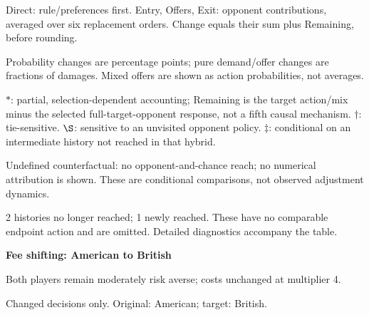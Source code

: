 \documentclass[10pt]{article}
\begin{document}
{\footnotesize Direct: rule/preferences first. Entry, Offers, Exit: opponent contributions, averaged over six replacement orders. Change equals their sum plus Remaining, before rounding.\par
Probability changes are percentage points; pure demand/offer changes are fractions of damages. Mixed offers are shown as action probabilities, not averages.\par
$*$: partial, selection-dependent accounting; Remaining is the target action/mix minus the selected full-target-opponent response, not a fifth causal mechanism. $\dagger$: tie-sensitive. $\S$: sensitive to an unvisited opponent policy. $\ddagger$: conditional on an intermediate history not reached in that hybrid.\par
Undefined counterfactual: no opponent-and-chance reach; no numerical attribution is shown. These are conditional comparisons, not observed adjustment dynamics.\par
2 histories no longer reached; 1 newly reached. These have no comparable endpoint action and are omitted. Detailed diagnostics accompany the table.}\par
\clearpage
{\large\bfseries Fee shifting: American to British}\par
Both players remain moderately risk averse; costs unchanged at multiplier 4.\par
{\small Changed decisions only. Original: American; target: British.}\par
\end{document}
